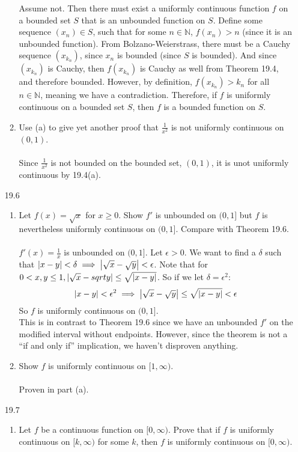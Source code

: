 \begin{enumerate}
\begin{enumerate}
        Assume not. Then there must exist a uniformly continuous function $f$ on a bounded set $S$ that is an unbounded function on $S$. Define some sequence $(x_n) \in S$, such that for some $n \in \mathds{N}$, $f(x_n) > n$ (since it is an unbounded function). From Bolzano-Weierstrass, there must be a Cauchy sequence $(x_{k_n})$, since $x_n$ is bounded (since $S$ is bounded). And since $(x_{k_n})$ is Cauchy, then $f(x_{k_n})$ is Cauchy as well from Theorem 19.4, and therefore bounded. However, by definition, $f(x_{k_n}) > k_n$ for all $n \in \mathds{N}$, meaning we have a contradiction. Therefore, if $f$ is uniformly continuous on a bounded set $S$, then $f$ is a bounded function on $S$.
      \item Use (a) to give yet another proof that $\frac{1}{x^2}$ is not uniformly continuous on $(0,1)$.\\\\

        Since $\frac{1}{x^2}$ is not bounded on the bounded set, $(0,1)$, it is unot uniformly continuous by 19.4(a).
    \end{enumerate}
  \item [19.6]
    \begin{enumerate}
      \item Let $f(x) = \sqrt{x}$ for $x \geq 0$. Show $f'$ is unbounded on $(0,1]$ but $f$ is nevertheless uniformly continuous on $(0,1]$. Compare with Theorem 19.6.\\\\

        $f'(x) = \frac{1}{x}$ is unbounded on $(0,1]$. Let $\epsilon > 0$. We want to find a $\delta$ such that $\left\vert x-y \right\vert < \delta \implies \left\vert \sqrt{x} - \sqrt{y} \right\vert < \epsilon$. Note that for $0 < x,y \leq 1, \left\vert \sqrt{x} - sqrt{y} \right\vert \leq \sqrt{\left\vert x-y \right\vert}$. So if we let $\delta = \epsilon^2$:
        $$\left\vert x-y \right\vert < \epsilon^2 \implies \left\vert \sqrt{x} - \sqrt{y} \right\vert \leq \sqrt{\left\vert x-y \right\vert} < \epsilon$$
        So $f$ is uniformly continuous on $(0,1]$.\\

        This is in contrast to Theorem 19.6 since we have an unbounded $f'$ on the modified interval without endpoints. However, since the theorem is not a ``if and only if'' implication, we haven't disproven anything.
      \item Show $f$ is uniformly continuous on $[1,\infty)$.\\\\

        Proven in part (a).
    \end{enumerate}
  \item [19.7]
    \begin{enumerate}
      \item Let $f$ be a continuous function on $[0,\infty)$. Prove that if $f$ is uniformly continuous on $[k,\infty)$ for some $k$, then $f$ is uniformly continuous on $[0,\infty)$.\\\\


\end{enumerate}
\end{enumerate}
